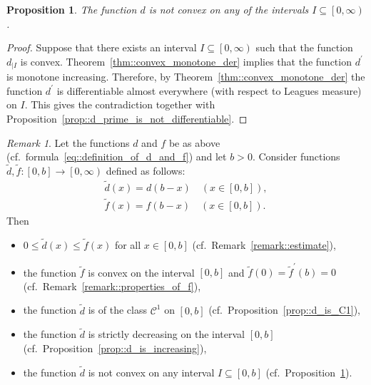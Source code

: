 \documentclass[12pt]{article}
\renewcommand{\leq}{\leqslant}
\newcommand{\ContClass}{\mathcal{C}}
\newcommand{\paren}[1]{\! \left(#1 \right)}
\newcommand{\bracket}[1]{\! \left[#1 \right]}
\theoremstyle{plain}
\newtheorem{proposition}[theorem]{Proposition}
\theoremstyle{definition}
\theoremstyle{remark}
\newtheorem{remark}[theorem]{Remark}
\begin{document}
\begin{proposition} \label{d_is_non_convex_on_any_interval}
    The function $d$ is not convex on any of the intervals $I \subseteq \left[0, \infty \right)$.
\end{proposition}
\begin{proof}
    Suppose that there exists an interval $I \subseteq \left[0, \infty \right)$ such that the function $d_{|I}$ is convex.
    Theorem~\ref{thm::convex_monotone_der} implies that the function $d^\prime$ is monotone increasing.
    Therefore, by Theorem~\ref{thm::convex_monotone_der} the function $d^\prime$ is differentiable almost everywhere (with respect to Leagues measure) on $I$.
    This gives the contradiction together with Proposition~\ref{prop::d_prime_is_not_differentiable}.
\end{proof}

\begin{remark}
    Let the functions $d$ and $f$ be as above (cf.\ formula~\eqref{eq::definition_of_d_and_f}) and let $b>0$.
    Consider functions $\widetilde{d}, \widetilde{f} \colon \bracket{0, b} \to \left[0, \infty \right)$ defined as follows:
    \begin{align*}
        \widetilde{d}\paren{x} = d\paren{b-x} \quad \paren{x \in \bracket{0, b}}, \\
        \widetilde{f}\paren{x} = f\paren{b-x} \quad \paren{x \in \bracket{0, b}}.
    \end{align*}
    Then
    \begin{itemize}
        \item $0 \leq \widetilde{d}\paren{x} \leq \widetilde{f}\paren{x}$ for all $x \in \bracket{0, b}$ (cf.\ Remark~\ref{remark::estimate}),
        \item the function $\widetilde{f}$ is convex on the interval $\bracket{0, b}$ and $\widetilde{f}\paren{0} = \widetilde{f}^\prime\paren{b} = 0$ (cf.\ Remark~\ref{remark::properties_of_f}),
        \item the function $\widetilde{d}$ is of the class $\ContClass^1$ on $\bracket{0, b}$ (cf.\ Proposition~\ref{prop::d_is_C1}),
        \item the function $\widetilde{d}$ is strictly decreasing on the interval $\bracket{0, b}$ (cf.\ Proposition~\ref{prop::d_is_increasing}),
        \item the function $\widetilde{d}$ is not convex on any interval $I \subseteq \bracket{0, b}$ (cf.\ Proposition~\ref{d_is_non_convex_on_any_interval}).
    \end{itemize}
\end{remark}

{}

\end{document}
